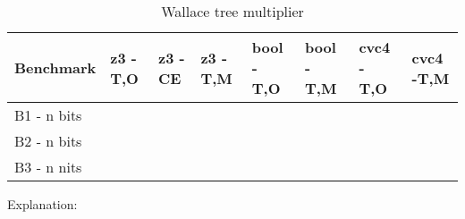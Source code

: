 \begin{table}[]
\centering
\caption{Wallace tree multiplier}
\label{my-label}
\begin{tabular}{|l|l|l|l|l|l|l|l|}
\hline
Benchmark   & z3 - T,O & z3 - CE & z3 - T,M & bool - T,O & bool - T,M & cvc4 - T,O & cvc4 -T,M \\ \hline
B1 - n bits &          &         &          &            &            &            &           \\ \hline
B2 - n bits &          &         &          &            &            &            &           \\ \hline
B3 - n nits &          &         &          &            &            &            &           \\ \hline
\end{tabular}
\end{table}

Explanation:







 

